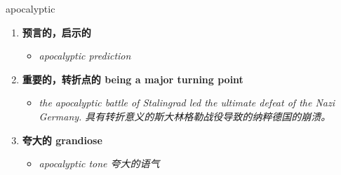 
\begin{frame}
{\huge apocalyptic}
\begin{center}
\begin{enumerate}\Large
  \item \textbf{预言的，启示的}
  \begin{itemize}
    \item \em{\Large{apocalyptic prediction}}
  \end{itemize}
  \item \textbf{重要的，转折点的 being a major turning point}
  \begin{itemize}
    \item \em{\Large{the apocalyptic battle of Stalingrad led the ultimate defeat of the Nazi Germany. 具有转折意义的斯大林格勒战役导致的纳粹德国的崩溃。}}
  \end{itemize}
  \item \textbf{夸大的 grandiose}
  \begin{itemize}
    \item \em{\Large{apocalyptic tone 夸大的语气}}
  \end{itemize}
\end{enumerate}
\end{center}
\end{frame}
